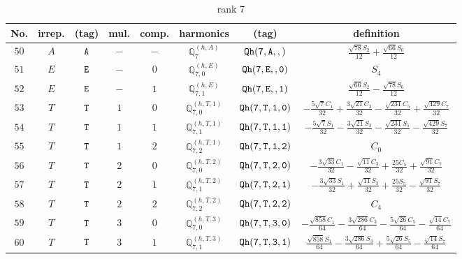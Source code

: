 \documentclass[fleqn,8pt]{jsarticle}
\begin{document}
\begin{table}[ht!]
\begin{center}
\caption{rank 7}
\renewcommand{\arraystretch}{1.3}
\begin{tabular}{cccccccc} \hline \hline
No. & irrep. & (tag) & mul. & comp. & harmonics & (tag) & definition \\ \hline
$ 50 $ & $ A $ & $ {\tt A} $ & $ - $ & $ - $ & $ \mathbb{Q}_{7}^{(h,A)} $ & $ {\tt Qh(7,A,,)} $ & $ \frac{\sqrt{78} S_{2}}{12} + \frac{\sqrt{66} S_{6}}{12} $ \\
$ 51 $ & $ E $ & $ {\tt E} $ & $ - $ & $ 0 $ & $ \mathbb{Q}_{7,0}^{(h,E)} $ & $ {\tt Qh(7,E,,0)} $ & $ S_{4} $ \\
$ 52 $ & $ E $ & $ {\tt E} $ & $ - $ & $ 1 $ & $ \mathbb{Q}_{7,1}^{(h,E)} $ & $ {\tt Qh(7,E,,1)} $ & $ \frac{\sqrt{66} S_{2}}{12} - \frac{\sqrt{78} S_{6}}{12} $ \\
$ 53 $ & $ T $ & $ {\tt T} $ & $ 1 $ & $ 0 $ & $ \mathbb{Q}_{7,0}^{(h,T,1)} $ & $ {\tt Qh(7,T,1,0)} $ & $ - \frac{5 \sqrt{7} C_{1}}{32} + \frac{3 \sqrt{21} C_{3}}{32} - \frac{\sqrt{231} C_{5}}{32} + \frac{\sqrt{429} C_{7}}{32} $ \\
$ 54 $ & $ T $ & $ {\tt T} $ & $ 1 $ & $ 1 $ & $ \mathbb{Q}_{7,1}^{(h,T,1)} $ & $ {\tt Qh(7,T,1,1)} $ & $ - \frac{5 \sqrt{7} S_{1}}{32} - \frac{3 \sqrt{21} S_{3}}{32} - \frac{\sqrt{231} S_{5}}{32} - \frac{\sqrt{429} S_{7}}{32} $ \\
$ 55 $ & $ T $ & $ {\tt T} $ & $ 1 $ & $ 2 $ & $ \mathbb{Q}_{7,2}^{(h,T,1)} $ & $ {\tt Qh(7,T,1,2)} $ & $ C_{0} $ \\
$ 56 $ & $ T $ & $ {\tt T} $ & $ 2 $ & $ 0 $ & $ \mathbb{Q}_{7,0}^{(h,T,2)} $ & $ {\tt Qh(7,T,2,0)} $ & $ - \frac{3 \sqrt{33} C_{1}}{32} - \frac{\sqrt{11} C_{3}}{32} + \frac{25 C_{5}}{32} + \frac{\sqrt{91} C_{7}}{32} $ \\
$ 57 $ & $ T $ & $ {\tt T} $ & $ 2 $ & $ 1 $ & $ \mathbb{Q}_{7,1}^{(h,T,2)} $ & $ {\tt Qh(7,T,2,1)} $ & $ - \frac{3 \sqrt{33} S_{1}}{32} + \frac{\sqrt{11} S_{3}}{32} + \frac{25 S_{5}}{32} - \frac{\sqrt{91} S_{7}}{32} $ \\
$ 58 $ & $ T $ & $ {\tt T} $ & $ 2 $ & $ 2 $ & $ \mathbb{Q}_{7,2}^{(h,T,2)} $ & $ {\tt Qh(7,T,2,2)} $ & $ C_{4} $ \\
$ 59 $ & $ T $ & $ {\tt T} $ & $ 3 $ & $ 0 $ & $ \mathbb{Q}_{7,0}^{(h,T,3)} $ & $ {\tt Qh(7,T,3,0)} $ & $ - \frac{\sqrt{858} C_{1}}{64} - \frac{3 \sqrt{286} C_{3}}{64} - \frac{5 \sqrt{26} C_{5}}{64} - \frac{\sqrt{14} C_{7}}{64} $ \\
$ 60 $ & $ T $ & $ {\tt T} $ & $ 3 $ & $ 1 $ & $ \mathbb{Q}_{7,1}^{(h,T,3)} $ & $ {\tt Qh(7,T,3,1)} $ & $ \frac{\sqrt{858} S_{1}}{64} - \frac{3 \sqrt{286} S_{3}}{64} + \frac{5 \sqrt{26} S_{5}}{64} - \frac{\sqrt{14} S_{7}}{64} $ \\

\end{tabular}
\end{center}
\end{table}
\end{document}
